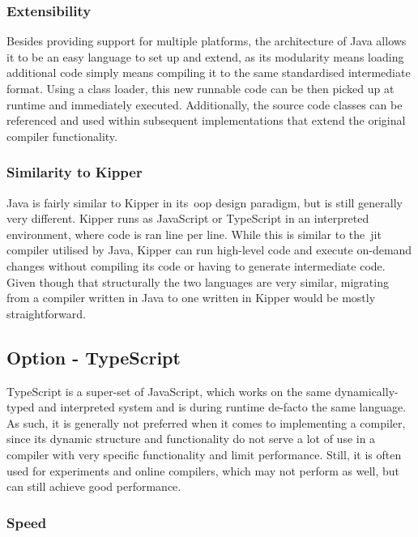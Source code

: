 \subsubsection{Extensibility}

Besides providing support for multiple platforms, the architecture of Java allows it to be an easy language to set up and extend, as its modularity means loading additional code simply means compiling it to the same standardised intermediate format. Using a class loader, this new runnable code can be then picked up at runtime and immediately executed. Additionally, the source code classes can be referenced and used within subsequent implementations that extend the original compiler functionality.

\subsubsection{Similarity to Kipper}

Java is fairly similar to Kipper in its~\acrshort{oop} design paradigm, but is still generally very different. Kipper runs as JavaScript or TypeScript in an interpreted environment, where code is ran line per line. While this is similar to the~\acrshort{jit} compiler utilised by Java, Kipper can run high-level code and execute on-demand changes without compiling its code or having to generate intermediate code. Given though that structurally the two languages are very similar, migrating from a compiler written in Java to one written in Kipper would be mostly straightforward.

\subsection{Option - TypeScript}
\label{sec:programming-language-option-typescript}

TypeScript is a super-set of JavaScript, which works on the same dynamically-typed and interpreted system and is during runtime de-facto the same language. As such, it is generally not preferred when it comes to implementing a compiler, since its dynamic structure and functionality do not serve a lot of use in a compiler with very specific functionality and limit performance. Still, it is often used for experiments and online compilers, which may not perform as well, but can still achieve good performance.

\subsubsection{Speed}

